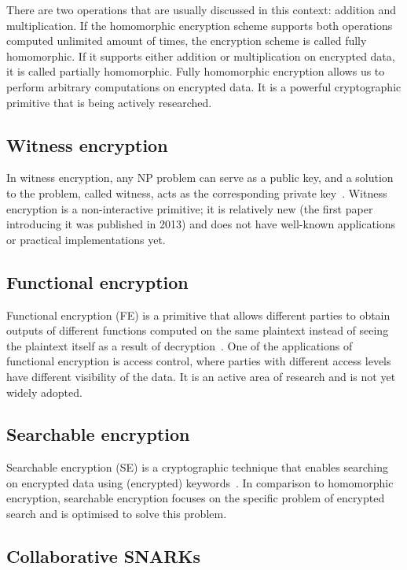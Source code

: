 \documentclass[
    9pt,            %
    report,        %
    affiltop,       %
]{art}
\begin{document}
There are two operations that are usually discussed in this context: addition and multiplication. If the homomorphic encryption scheme supports both operations computed unlimited amount of times, the encryption scheme is called fully homomorphic. If it supports either addition or multiplication on encrypted data, it is called partially homomorphic. Fully homomorphic encryption allows us to perform arbitrary computations on encrypted data. It is a powerful cryptographic primitive that is being actively researched.

\subsection{Witness encryption}\label{WE}

In witness encryption, any NP problem can serve as a public key, and a solution to the problem, called
witness, acts as the corresponding private key~\citep{we}. Witness encryption
is a non-interactive primitive; it is relatively new (the first paper
introducing it was published in 2013) and does not have well-known applications
or practical implementations yet.

\subsection{Functional encryption}\label{FE}

Functional encryption (FE) is a primitive that allows different parties
to obtain outputs of different functions computed on the same plaintext instead of seeing the plaintext itself as a result of decryption~\citep{fe}. One of the applications of functional encryption is access control, where parties with different access levels have different visibility of
the data. It is an active area of research and is not yet widely adopted.

\subsection{Searchable encryption}\label{SE}

Searchable encryption (SE) is a cryptographic technique that enables searching
on encrypted data using (encrypted) keywords~\citep{se}. In comparison to
homomorphic encryption, searchable encryption focuses on the specific
problem of encrypted search and is optimised to solve this problem.


\subsection{Collaborative SNARKs}\label{CoSNARKs}
\end{document}
